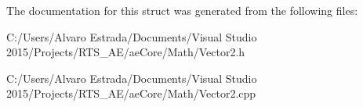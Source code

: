 The documentation for this struct was generated from the following files\+:\begin{DoxyCompactItemize}
\item 
C\+:/\+Users/\+Alvaro Estrada/\+Documents/\+Visual Studio 2015/\+Projects/\+R\+T\+S\+\_\+\+A\+E/ae\+Core/\+Math/Vector2.\+h\item 
C\+:/\+Users/\+Alvaro Estrada/\+Documents/\+Visual Studio 2015/\+Projects/\+R\+T\+S\+\_\+\+A\+E/ae\+Core/\+Math/Vector2.\+cpp\end{DoxyCompactItemize}
